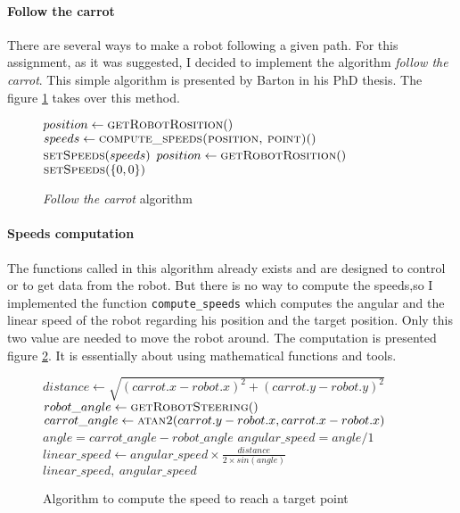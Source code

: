 \paragraph{Follow the carrot}{
    There are several ways to make a robot following a given path. For this
assignment, as it was suggested, I decided to implement the algorithm
\textit{follow the carrot}. This simple algorithm is presented by Barton in
his PhD thesis\cite{thesis:barton}. The figure \ref{algo:base} takes over
this method.
}

\begin{figure}[!h]
    \begin{algorithmic}
            \State $position \gets \Call{getRobotRosition}$
                \State $speeds \gets \Call{compute\_speeds(position, point)}$
                \State $\Call{setSpeeds}{speeds}$
                \State $position \gets \Call{getRobotRosition}$
            \EndWhile
        \EndFor
        \State $\Call{setSpeeds}{\{0, 0\}}$
    \end{algorithmic}
    
    \caption{
        \label{algo:base}
        \textit{Follow the carrot} algorithm
    }
\end{figure}

\paragraph{Speeds computation}{
    The functions called in this algorithm already exists and are designed to
control or to get data from the robot. But there is no way to compute the speeds,so I implemented the function \texttt{compute\_speeds} which computes
the angular and the linear speed of the robot regarding his position and the
target position. Only this two value are needed to move the robot around.
The computation is presented figure \ref{algo:speeds}. It is essentially about
using mathematical functions and tools.
}

\begin{figure}[!h]
    \begin{algorithmic}
        \State $distance \gets \sqrt{(carrot.x - robot.x)^{2} + (carrot.y - robot.y)^{2}}$
        \State $robot\_angle \gets \Call{getRobotSteering}$
        \State $carrot\_angle \gets \Call{atan2}{carrot.y - robot.x, carrot.x - robot.x}$
        \State $angle = carrot\_angle - robot\_angle$
        \State $angular\_speed = angle / 1$
        \State $linear\_speed \gets angular\_speed \times \frac{distance}{2 \times sin( angle )} $
        \State \Return $linear\_speed,~angular\_speed$
     \EndFunction
    \end{algorithmic}
    
    \caption{
        \label{algo:speeds}
        Algorithm to compute the speed to reach a target point
    }
\end{figure}

